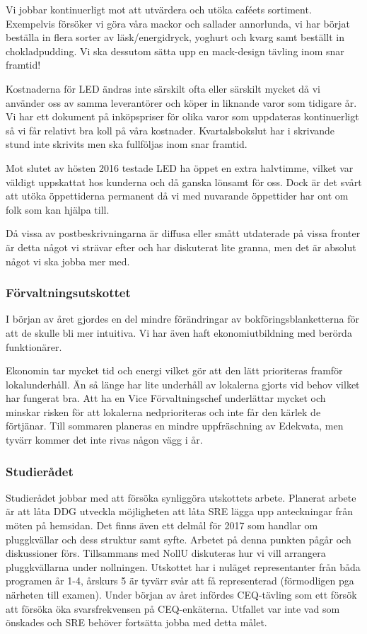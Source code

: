\documentclass[../_main/handlingar.tex]{subfiles}
\begin{document}
Vi jobbar kontinuerligt mot att utvärdera och utöka caféets sortiment. Exempelvis försöker vi göra våra mackor och sallader annorlunda, vi har börjat beställa in flera sorter av läsk/energidryck, yoghurt och kvarg samt beställt in chokladpudding. Vi ska dessutom sätta upp en mack-design tävling inom snar framtid!

Kostnaderna för LED ändras inte särskilt ofta eller särskilt mycket då vi använder oss av samma leverantörer och köper in liknande varor som tidigare år. Vi har ett dokument på inköpspriser för olika varor som uppdateras kontinuerligt så vi får relativt bra koll på våra kostnader. Kvartalsbokslut har i skrivande stund inte skrivits men ska fullföljas inom snar framtid.

Mot slutet av hösten 2016 testade LED ha öppet en extra halvtimme, vilket var väldigt uppskattat hos kunderna och då ganska lönsamt för oss. Dock är det svårt att utöka öppettiderna permanent då vi med nuvarande öppettider har ont om folk som kan hjälpa till.

Då vissa av postbeskrivningarna är diffusa eller smått utdaterade på vissa fronter är detta något vi strävar efter och har diskuterat lite granna, men det är absolut något vi ska jobba mer med.

\subsubsection*{Förvaltningsutskottet}
I början av året gjordes en del mindre förändringar av bokföringsblanketterna för att de skulle bli mer intuitiva. Vi har även haft ekonomiutbildning med berörda funktionärer.

Ekonomin tar mycket tid och energi vilket gör att den lätt prioriteras framför lokalunderhåll. Än så länge har lite underhåll av lokalerna gjorts vid behov vilket har fungerat bra. Att ha en Vice Förvaltningschef underlättar mycket och minskar risken för att lokalerna nedprioriteras och inte får den kärlek de förtjänar. Till sommaren planeras en mindre uppfräschning av Edekvata, men tyvärr kommer det inte rivas någon vägg i år.

\subsubsection*{Studierådet}
Studierådet jobbar med att försöka synliggöra utskottets arbete. Planerat arbete är att låta DDG utveckla möjligheten att låta SRE lägga upp anteckningar från möten på hemsidan. Det finns även ett delmål för 2017 som handlar om pluggkvällar och dess struktur samt syfte. Arbetet på denna punkten pågår och diskussioner förs. Tillsammans med NollU diskuteras hur vi vill arrangera pluggkvällarna under nollningen. Utskottet har i nuläget representanter från båda programen år 1-4, årskurs 5 är tyvärr svår att få representerad (förmodligen pga närheten till examen). Under början av året infördes CEQ-tävling som ett försök att försöka öka svarsfrekvensen på CEQ-enkäterna. Utfallet var inte vad som önskades och SRE behöver fortsätta jobba med detta målet.
\end{document}
